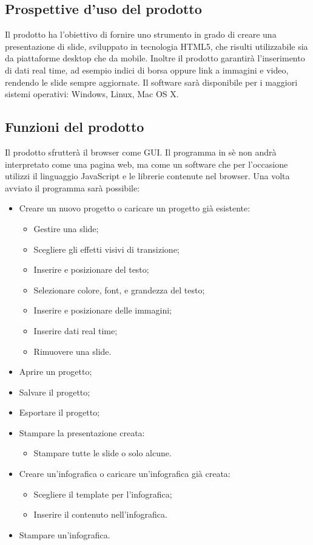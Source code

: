\subsection{Prospettive d'uso del prodotto}
Il prodotto ha l'obiettivo di fornire uno strumento in grado di creare una presentazione di slide, sviluppato in tecnologia HTML5, che risulti utilizzabile sia da piattaforme desktop che da mobile. Inoltre il prodotto garantirà l'inserimento di dati real time, ad esempio indici di borsa oppure link a immagini e video, rendendo le slide sempre aggiornate. Il software sarà disponibile per i maggiori sistemi operativi: Windows, Linux, Mac OS X.

\subsection{Funzioni del prodotto}
Il prodotto sfrutterà il browser come GUI. Il programma in sè non andrà interpretato come una pagina web, ma come un software che per l'occasione utilizzi il linguaggio JavaScript e le librerie contenute nel browser.
Una volta avviato il programma sarà possibile:
\begin{itemize}
	\item Creare un nuovo progetto o caricare un progetto già esistente:
	\begin{itemize}
		\item Gestire una slide;
		\item Scegliere gli effetti visivi di transizione;
		\item Inserire e posizionare del testo;
		\item Selezionare colore, font, e grandezza del testo;
		\item Inserire e posizionare delle immagini;
		\item Inserire dati real time;
		\item Rimuovere una slide.
	\end{itemize}
	\item Aprire un progetto;
	\item Salvare il progetto;
	\item Esportare il progetto;
	\item Stampare la presentazione creata:
	\begin{itemize}
		\item Stampare tutte le slide o solo alcune.
	\end{itemize}
	\item Creare un'infografica o caricare un'infografica già creata:
	\begin{itemize}
		\item Scegliere il template per l'infografica;
		\item Inserire il contenuto nell'infografica.
	\end{itemize}
	\item Stampare un'infografica.
\end{itemize}

